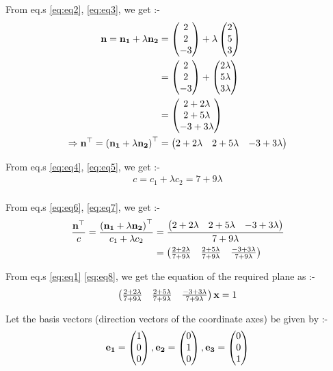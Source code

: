 \documentclass[journal,12pt,twocolumn]{IEEEtran}
\renewcommand\thesection{\arabic{section}}
\begin{document}
\begin{enumerate}[label=\thesection.\arabic*.,ref=\thesection.\theenumi]
From eq.s \eqref{eq:eq2}, \eqref{eq:eq3}, we get :-
\begin{align}
\mathbf{n} = \mathbf{n_1} + \lambda \mathbf{n_2} &= \begin{pmatrix}2 \\ 2 \\ -3\end{pmatrix} + \lambda \begin{pmatrix}2 \\ 5 \\ 3\end{pmatrix}
\\
&= \begin{pmatrix}2 \\ 2 \\ -3\end{pmatrix} + \begin{pmatrix}2 \lambda \\ 5 \lambda \\ 3 \lambda\end{pmatrix}
\\
&= \begin{pmatrix}2 + 2 \lambda \\ 2 + 5 \lambda \\ -3 + 3 \lambda\end{pmatrix}
\\
\Rightarrow \mathbf{n}^{\top} = \left( \mathbf{n_1} + \lambda \mathbf{n_2} \right)^{\top} &= \begin{pmatrix}2 + 2 \lambda & 2 + 5 \lambda & -3 + 3 \lambda\end{pmatrix} \label{eq:eq6}
\end{align}

From eq.s \eqref{eq:eq4}, \eqref{eq:eq5}, we get :-
\begin{align}
c = c_1 + \lambda c_2 = 7 + 9 \lambda \label{eq:eq7}
\end{align}
\\
From eq.s \eqref{eq:eq6}, \eqref{eq:eq7}, we get :-
\begin{align}
\frac{\mathbf{n}^{\top}}{c} = \frac{\left( \mathbf{n_1} + \lambda \mathbf{n_2} \right)^{\top}}{c_1 + \lambda c_2} &= \frac{\begin{pmatrix}2 + 2 \lambda & 2 + 5 \lambda & -3 + 3 \lambda\end{pmatrix}}{7 + 9 \lambda}
\\
&= \begin{pmatrix}\frac{2 + 2 \lambda}{7 + 9 \lambda} & \frac{2 + 5 \lambda}{7 + 9 \lambda} & \frac{-3 + 3 \lambda}{7 + 9 \lambda}\end{pmatrix} \label{eq:eq8}
\end{align}

From eq.s \eqref{eq:eq1} \eqref{eq:eq8}, we get the equation of the required plane as :-
\begin{align}
\begin{pmatrix}\frac{2 + 2 \lambda}{7 + 9 \lambda} & \frac{2 + 5 \lambda}{7 + 9 \lambda} & \frac{-3 + 3 \lambda}{7 + 9 \lambda}\end{pmatrix}\mathbf{x} = 1 \label{eq:eq9}
\end{align}

Let the basis vectors (direction vectors of the coordinate axes) be given by :-
\begin{align}
\mathbf{e_1} = \begin{pmatrix}1 \\ 0 \\ 0\end{pmatrix}, \mathbf{e_2} = \begin{pmatrix}0 \\ 1 \\ 0\end{pmatrix}, \mathbf{e_3} = \begin{pmatrix}0 \\ 0 \\ 1\end{pmatrix}
\end{align}


\end{enumerate}
\end{document}
